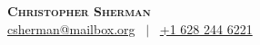 \documentclass[letterpaper,11pt]{res}
\begin{document}
\noindent \textbf{\Huge \scshape Christopher Sherman} \\ 
\vspace{0.2cm}
\href{mailto:csherman@mailbox.org}{csherman@mailbox.org} \ $|$ \ \href{tel:+16282446221}{+1 628 244 6221}  \\











\end{document}

